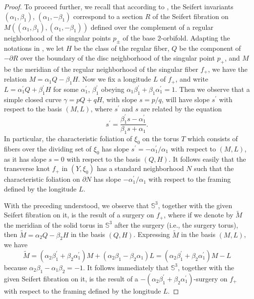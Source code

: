 \documentclass[11pt]{amsart}
\theoremstyle{plain}
\numberwithin{theorem}{section}
\theoremstyle{definition}
\newcommand{\s}{{\mathbb S}}
\begin{document}
\begin{proof}
To proceed further, we recall that according to \cite{N}, the Seifert invariants $(\alpha_1,\beta_1)$, 
$(\alpha_1,-\beta_1)$ correspond to a section $R$ of the Seifert fibration on 
$M((\alpha_1,\beta_1), (\alpha_1,-\beta_1))$ defined over the complement of a regular neighborhood of the singular points $p_{\pm}$ of the base $2$-orbifold. Adapting the notations in \cite{N}, we let $H$ be the class of the regular fiber, $Q$ be the component of $-\partial R$ over the boundary of the disc neighborhood of the singular point $p_{+}$, and $M$ be the meridian of the regular neighborhood of the singular fiber $f_{+}$, we have the relation $M=\alpha_1 Q-\beta_1 H$. 
Now we fix a longitude $L$ of $f_{+}$, and write $L=\alpha_1^\prime Q+\beta_1^\prime H$ for 
some $\alpha_1^\prime$, $\beta_1^\prime$ obeying $\alpha_1\beta_1^\prime+\beta_1\alpha_1^\prime=1$. Then we observe
that a simple closed curve $\gamma=pQ+q H$, with slope $s=p/q$, will have slope $s^\prime$ with
respect to the basis $(M,L)$, where $s^\prime$ and $s$ are related by the equation
$$
s^\prime=\frac{\beta_1^\prime s-\alpha_1^\prime}{\beta_1 s+\alpha_1}.
$$
In particular, the characteristic foliation of $\xi_0$ on the torus $T$ which consists of fibers over the
dividing set of $\xi_0$ has slope $s^\prime=-\alpha_1^\prime/\alpha_1$ with respect to $(M,L)$, as it has slope $s=0$ with respect to the basis $(Q,H)$. It follows easily that the transverse knot $f_{+}$ in $(Y,\xi_0)$ has a standard neighborhood $N$ such that the characteristic foliation on
$\partial N$ has slope $-\alpha_1^\prime/\alpha_1$ with respect to the framing defined by the longitude $L$. 

With the preceding understood, we observe that $\s^3$, together with the given Seifert fibration on it,
is the result of a surgery on $f_{+}$, where if we denote by $\tilde{M}$ the meridian of the solid 
torus in $\s^3$ after the surgery (i.e., the surgery torus), then $\tilde{M}=\alpha_2 Q-\beta_2 H$ in the basis $(Q,H)$. Expressing $\tilde{M}$ in the basis $(M,L)$, we have 
$$
\tilde{M}=(\alpha_2\beta_1^\prime+\beta_2\alpha_1^\prime)M+(\alpha_2\beta_1-\beta_2\alpha_1)L=
(\alpha_2\beta_1^\prime+\beta_2\alpha_1^\prime)M-L
$$
because $\alpha_2\beta_1-\alpha_1\beta_2=-1$. It follows immediately that $\s^3$, together with the given Seifert fibration on it, is the result of a $-(\alpha_2\beta_1^\prime+\beta_2\alpha_1^\prime)$-surgery on $f_{+}$ with respect to the framing defined by the longitude $L$. 


\end{proof}
\end{document}
